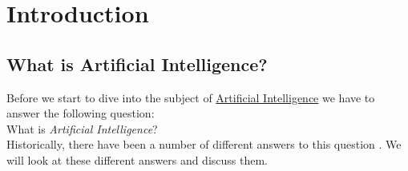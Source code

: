 \chapter{Introduction}

\section{What is Artificial Intelligence?}
Before we start to dive into the subject of
\href{https://en.wikipedia.org/wiki/Artificial_intelligence}{Artificial Intelligence} we have to answer the
following question:  
\\[0.2cm]
\hspace*{1.3cm}
What is \emph{Artificial Intelligence}? 
\\[0.2cm] 
Historically, there have been a number of different answers to this question \cite{russell:2009}.  We will look at these
different answers and discuss them.
